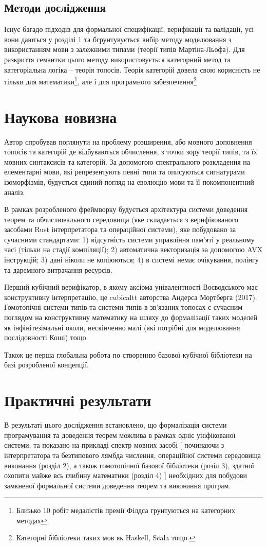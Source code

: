\subsection*{Методи дослідження}
Існує багадо підходів для формальної специфікації,
верифікації та валідації, усі вони даються у розділі 1 та
бгрунтувується вибір методу моделювання з використанням
мови з залежними типами (теорії типів Мартіна-Льофа).
Для разкриття семантки цього методу використовується
категорний метод та категоріальна логіка -- теорія топосів.
Теорія категорій довела свою корисність не тільки для
математики\footnote{Близько 10 робіт медалістів премії Філдса грунтуються на категорних методах},
але і для програмного забезпечення\footnote{Категорні бібліотеки таких мов як Haskell, Scala тощо.}

\section*{Наукова новизна}
Автор спробував поглянути на проблему розширення, або мовного доповнення
топосів та категорій де відбуваються обчислення, з точки зору теорії типів,
та їх мовних синтаксисів та категорій. За допомогою спектрального розкладення на
елементарні мови, які репрезентують певні типи та описуються сигнатурами ізоморфізмів,
будується єдиний погляд на еволюцію мови та її покомпонентний аналіз.

В рамках розробленого фреймворку будується
архітектура системи доведення теорем та обчислювального
середовища (яке складається з верифікованого засобами Rust
інтерпретатора та операційної системи), яке побудовано за сучасними стандартами:
1) відсутність системи управління пам'яті у реальному часі (тільки на стадії компіляції);
2) автоматична векторизація за допомогою AVX інструкцій;
3) дані ніколи не копіюються;
4) в системі немає очікування, полінгу та даремного витрачання ресурсів.

Перший кубічний верифікатор, в якому аксіома унівалентності
Воєводського має конструктивну інтерпретацію, це cubicaltt авторства Андерса Мортберга (2017).
Гомотопічні системи типів та системи типів в зв'язаних топосах є сучасним поглядом на
конструктивну математику на шляху до формалізації таких моделей як інфінітезімальні околи,
нескінченно малі (які потрібні для моделювання послідовності Коші) тощо.

Також це перша глобальна робота по створенню базової кубічної бібліотеки
на базі розробленої концепції.

\section*{Практичні результати}
В результаті цього дослідження встановлено, що формалізація системи
програмування та доведення теорем можлива в рамках одніє уніфікованої
системи, та показано на прикладі спектр мовних засобі [ починаючи з інтерпретатора
та безтипового лямбда числення, операційної системи середовища виконання (розділ 2),
а також гомотопічної базової бібліотеки (розіл 3), здатної охопити майже всь
глибину математики (розділ 4) ] необхідних для побудови замкненої формальної системи
доведення теорем та виконання програм.


